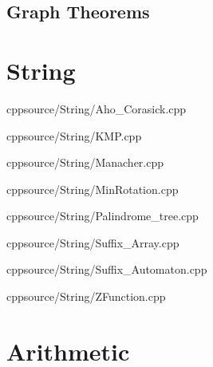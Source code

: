 \documentclass[portrait, 8pt, a4paper, oneside, twocolumn]{extarticle}
\begin{document}
\subsection{Graph Theorems}








\section{String}

{}{}
{cpp}{source/String/Aho_Corasick.cpp}

{}{}
{cpp}{source/String/KMP.cpp}

{cpp}{source/String/Manacher.cpp}

{cpp}{source/String/MinRotation.cpp}


{}{}
{cpp}{source/String/Palindrome_tree.cpp}

{}{}
{cpp}{source/String/Suffix_Array.cpp}

{}{}
{cpp}{source/String/Suffix_Automaton.cpp}


{}{}
{cpp}{source/String/ZFunction.cpp}












\section{Arithmetic}
\end{document}
